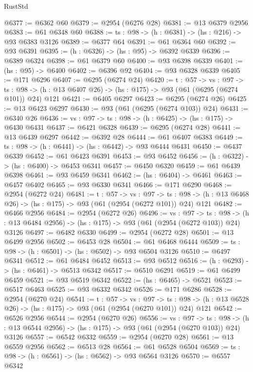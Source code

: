\begin{lexlean}{RustStd}
\begin{coremodule}
@6377 := @6362 @60
@6379 := @2954 (@6276 @28)
@6381 := @13 @6379 @2956
@6383 := @61 @6348 @60
@6388 := {ts : @98} -> (h : @6381) -> (hs : @216) -> @93 @6383 @3126
@6389 := @6377 @64
@6391 := @61 @6364 @60
@6392 := @93 @6391
@6395 := (h : @6326) -> (hs : @95) -> @6392 @6339
@6396 := @6389 @6324
@6398 := @61 @6379 @60
@6400 := @93 @6398 @6339
@6401 := (hs : @95) -> @6400
@6402 := @6396 @92
@6404 := @93 @6328 @6339
@6405 := @171 @6296
@6407 := @6295 (@6274 @24)
@6420 := {t : @57} ->
  {vs : @97} ->
  {ts : @98} -> (h : @13 @6407 @26) -> (hs : @175) -> @93 (@61 (@6295 (@6274 @101)) @24) @121
@6421 := @6405 @6297
@6423 := @6295 (@6274 @26)
@6425 := @13 @6423 @6297
@6430 := @93 (@61 (@6295 (@6274 @103)) @24)
@6431 := @6340 @26
@6436 := {vs : @97} -> {ts : @98} -> (h : @6425) -> (hs : @175) -> @6430 @6431
@6437 := @6421 @6328
@6439 := @6295 (@6274 @28)
@6441 := @13 @6439 @6297
@6442 := @6392 @28
@6444 := @61 @6407 @6383
@6449 := {ts : @98} -> (h : @6441) -> (hs : @6442) -> @93 @6444 @6431
@6450 := @6437 @6339
@6452 := @61 @6423 @6391
@6453 := @93 @6452
@6456 := (h : @6322) -> (hs : @6400) -> @6453 @6341
@6457 := @6450 @6320
@6459 := @61 @6439 @6398
@6461 := @93 @6459 @6341
@6462 := (hs : @6404) -> @6461
@6463 := @6457 @6402
@6465 := @93 @6330 @6341
@6466 := @171 @6290
@6468 := @2954 (@6272 @24)
@6481 := {t : @57} ->
  {vs : @97} ->
  {ts : @98} -> (h : @13 @6468 @26) -> (hs : @175) -> @93 (@61 (@2954 (@6272 @101)) @24) @121
@6482 := @6466 @2956
@6484 := @2954 (@6272 @26)
@6496 := {vs : @97} ->
  {ts : @98} -> (h : @13 @6484 @2956) -> (hs : @175) -> @93 (@61 (@2954 (@6272 @103)) @24) @3126
@6497 := @6482 @6330
@6499 := @2954 (@6272 @28)
@6501 := @13 @6499 @2956
@6502 := @6453 @28
@6504 := @61 @6468 @6444
@6509 := {ts : @98} -> (h : @6501) -> (hs : @6502) -> @93 @6504 @3126
@6510 := @6497 @6341
@6512 := @61 @6484 @6452
@6513 := @93 @6512
@6516 := (h : @6293) -> (hs : @6461) -> @6513 @6342
@6517 := @6510 @6291
@6519 := @61 @6499 @6459
@6521 := @93 @6519 @6342
@6522 := (hs : @6465) -> @6521
@6523 := @6517 @6463
@6525 := @93 @6332 @6342
@6526 := @171 @6286
@6528 := @2954 (@6270 @24)
@6541 := {t : @57} ->
  {vs : @97} ->
  {ts : @98} -> (h : @13 @6528 @26) -> (hs : @175) -> @93 (@61 (@2954 (@6270 @101)) @24) @121
@6542 := @6526 @2956
@6544 := @2954 (@6270 @26)
@6556 := {vs : @97} ->
  {ts : @98} -> (h : @13 @6544 @2956) -> (hs : @175) -> @93 (@61 (@2954 (@6270 @103)) @24) @3126
@6557 := @6542 @6332
@6559 := @2954 (@6270 @28)
@6561 := @13 @6559 @2956
@6562 := @6513 @28
@6564 := @61 @6528 @6504
@6569 := {ts : @98} -> (h : @6561) -> (hs : @6562) -> @93 @6564 @3126
@6570 := @6557 @6342

\end{coremodule}
\end{lexlean}

